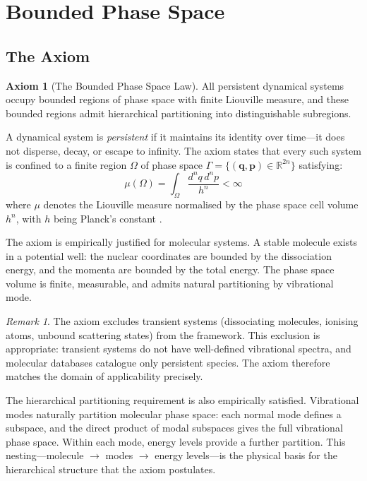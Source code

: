\documentclass[11pt,a4paper]{article}
\theoremstyle{definition}
\newtheorem{axiom}{Axiom}
\theoremstyle{remark}
\newtheorem{remark}[theorem]{Remark}
\newcommand{\Real}{\mathbb{R}}
\begin{document}
\section{Bounded Phase Space}
\label{sec:bounded_phase_space}

\subsection{The Axiom}

\begin{axiom}[The Bounded Phase Space Law]
\label{ax:bpsl}
All persistent dynamical systems occupy bounded regions of phase space with finite Liouville measure, and these bounded regions admit hierarchical partitioning into distinguishable subregions.
\end{axiom}

A dynamical system is \emph{persistent} if it maintains its identity over time---it does not disperse, decay, or escape to infinity. The axiom states that every such system is confined to a finite region $\Omega$ of phase space $\Gamma = \{(\mathbf{q}, \mathbf{p}) \in \Real^{2n}\}$ satisfying:
\begin{equation}
\mu(\Omega) = \int_\Omega \frac{d^n q \, d^n p}{h^n} < \infty
\label{eq:finite_measure}
\end{equation}
where $\mu$ denotes the Liouville measure normalised by the phase space cell volume $h^n$, with $h$ being Planck's constant \citep{planck1901}.

The axiom is empirically justified for molecular systems. A stable molecule exists in a potential well: the nuclear coordinates are bounded by the dissociation energy, and the momenta are bounded by the total energy. The phase space volume is finite, measurable, and admits natural partitioning by vibrational mode.

\begin{remark}
The axiom excludes transient systems (dissociating molecules, ionising atoms, unbound scattering states) from the framework. This exclusion is appropriate: transient systems do not have well-defined vibrational spectra, and molecular databases catalogue only persistent species. The axiom therefore matches the domain of applicability precisely.
\end{remark}

The hierarchical partitioning requirement is also empirically satisfied. Vibrational modes naturally partition molecular phase space: each normal mode defines a subspace, and the direct product of modal subspaces gives the full vibrational phase space. Within each mode, energy levels provide a further partition. This nesting---molecule $\to$ modes $\to$ energy levels---is the physical basis for the hierarchical structure that the axiom postulates.
\end{document}
